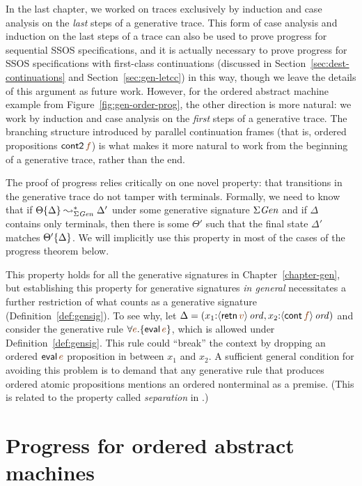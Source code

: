 In the last chapter, we worked on traces exclusively by induction and
case analysis on the {\it last} steps of a generative trace.  This
form of case analysis and induction on the last steps of a trace can
also be used to prove progress for sequential SSOS specifications, and
it is actually necessary to prove progress for SSOS specifications
with first-class continuations (discussed in
Section~\ref{sec:dest-continuations} and Section~\ref{sec:gen-letcc})
in this way, though we leave the details of this argument as future
work. However, for the ordered abstract machine example from
Figure~\ref{fig:gen-order-prog}, the other direction is more natural:
we work by induction and case analysis on the {\it first} steps of a
generative trace. The branching structure introduced by parallel
continuation frames (that is, ordered propositions ${\sf
  cont2}\,\lf{f}$) is what makes it more natural to work from the
beginning of a generative trace, rather than the end.

The proof of progress relies critically on one novel property: that
transitions in the generative trace do not tamper with terminals.
Formally, we need to know that if ${\Theta}\{{\Delta}\}
\leadsto^*_{\Sigma{\it Gen}} \Delta'$ under some generative signature
$\Sigma{\it Gen}$ and if $\Delta$ contains only terminals, then there
is some $\Theta'$ such that the final state $\Delta'$ matches
${\Theta'}\{{\Delta}\}$. We will implicitly use this property in
most of the cases of the progress theorem below.

This property holds for all the generative signatures in
Chapter~\ref{chapter-gen}, but establishing this property for
generative signatures {\it in general} necessitates a further
restriction of what counts as a generative signature
(Definition~\ref{def:gensig}). To see why, let $\Delta =
(x_1{:}\istrue{\susp{{\sf retn}\,\lf{v}}}, x_2{:}\istrue{\susp{{\sf
      cont}\,\lf{f}}})$ and consider the generative rule $\forall
\lf{e}. \{ {\sf eval}\,\lf{e} \}$, which is allowed under
Definition~\ref{def:gensig}. This rule could ``break'' the context by
dropping an ordered ${\sf eval}\,\lf{e}$ proposition in between $x_1$
and $x_2$. A sufficient general condition for avoiding this problem 
is to demand that any generative rule that produces ordered
atomic propositions mentions an ordered nonterminal as a premise.
(This is related to the property called {\it separation} in 
\cite{simmons08linear}.)

\section{Progress for ordered abstract machines}

